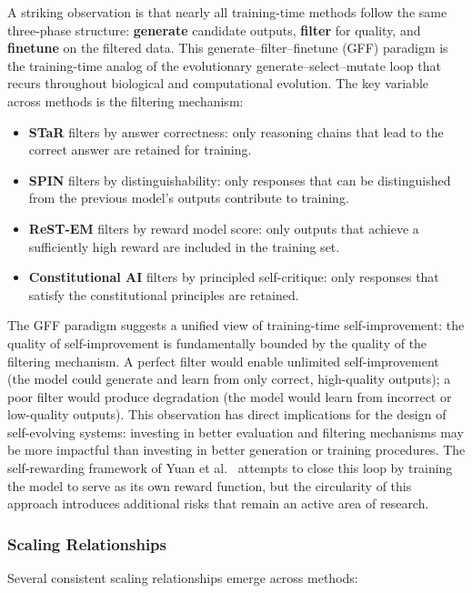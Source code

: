 A striking observation is that nearly all training-time methods follow the same three-phase structure: \textbf{generate} candidate outputs, \textbf{filter} for quality, and \textbf{finetune} on the filtered data. This generate--filter--finetune (GFF) paradigm is the training-time analog of the evolutionary generate--select--mutate loop that recurs throughout biological and computational evolution. The key variable across methods is the filtering mechanism:

\begin{itemize}
    \item \textbf{STaR} filters by answer correctness: only reasoning chains that lead to the correct answer are retained for training.
    \item \textbf{SPIN} filters by distinguishability: only responses that can be distinguished from the previous model's outputs contribute to training.
    \item \textbf{ReST-EM} filters by reward model score: only outputs that achieve a sufficiently high reward are included in the training set.
    \item \textbf{Constitutional AI} filters by principled self-critique: only responses that satisfy the constitutional principles are retained.
\end{itemize}

The GFF paradigm suggests a unified view of training-time self-improvement: the quality of self-improvement is fundamentally bounded by the quality of the filtering mechanism. A perfect filter would enable unlimited self-improvement (the model could generate and learn from only correct, high-quality outputs); a poor filter would produce degradation (the model would learn from incorrect or low-quality outputs). This observation has direct implications for the design of self-evolving systems: investing in better evaluation and filtering mechanisms may be more impactful than investing in better generation or training procedures. The self-rewarding framework of Yuan et al.~\citep{yuan2024selfrewarding} attempts to close this loop by training the model to serve as its own reward function, but the circularity of this approach introduces additional risks that remain an active area of research.


\subsubsection{Scaling Relationships}

Several consistent scaling relationships emerge across methods:

